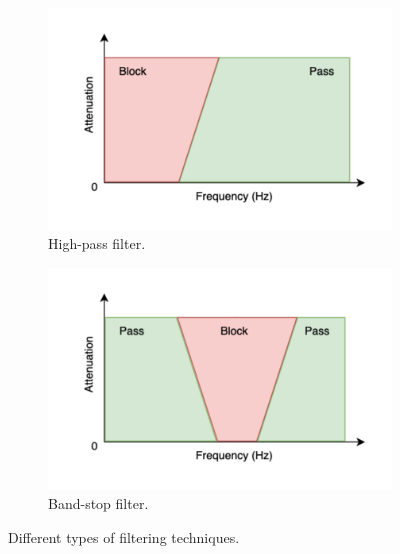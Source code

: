 \begin{figure}[t]
\begin{subfigure}{0.45\textwidth}
        \centering
        \includegraphics[width=\textwidth]{../images/pipeline/highpass_filter.pdf}
        \captionsetup{width=\linewidth}
        \captionsetup{justification=centering}
        \caption{High-pass filter.}
        \label{fig:processing_signals_filters_highpass}
    \end{subfigure}
    \hfill
    \begin{subfigure}{0.45\textwidth}
        \centering
        \includegraphics[width=\textwidth]{../images/pipeline/bandstop_filter.pdf}
        \captionsetup{width=\linewidth}
        \captionsetup{justification=centering}
        \caption{Band-stop filter.}
        \label{fig:processing_signals_filters_bandstop}
    \end{subfigure}
    \captionsetup{width=\linewidth}
    \captionsetup{justification=centering}
    \caption{Different types of filtering techniques.}
    \label{fig:processing_signals_filters}
\end{figure}

